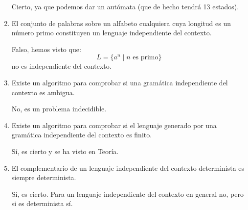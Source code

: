 \documentclass[12pt]{article}
\begin{document}
\begin{ejercicio}[2.5 puntos]
\begin{enumerate}
            Cierto, ya que podemos dar un autómata (que de hecho tendrá 13 estados).
            \item El conjunto de palabras sobre un alfabeto cualquiera cuya longitud es un número primo constituyen un lenguaje independiente del contexto.
            
            Falso, hemos visto que:
            \begin{equation*}
                L=\{a^n\mid n\text{ es primo}\}
            \end{equation*}
            no es independiente del contexto.
            \item Existe un algoritmo para comprobar si una gramática independiente del contexto es ambigua.
            
            No, es un problema indecidible.
            \item Existe un algoritmo para comprobar si el lenguaje generado por una gramática independiente del contexto es finito.
            
            Sí, es cierto y se ha visto en Teoría.
            \item El complementario de un lenguaje independiente del contexto determinista es siempre determinista.
            
            Sí, es cierto. Para un lenguaje independiente del contexto en general no, pero si es determinista sí.
        \end{enumerate}
    \end{ejercicio}
\end{document}
